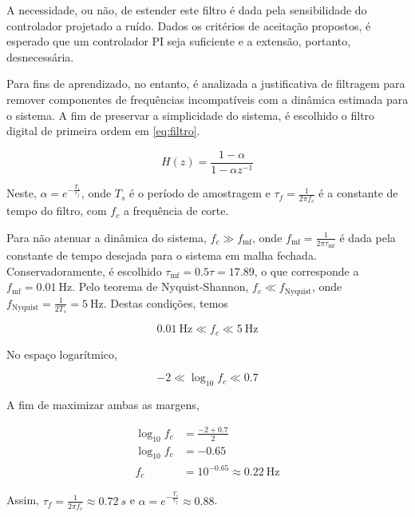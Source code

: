 \documentclass[conference,harvard,brazil,english]{sbatex}
\begin{document}
A necessidade, ou não, de estender este filtro é dada pela sensibilidade do controlador projetado a ruído\cite{Aguirre2023}. Dados os critérios de aceitação propostos, é esperado que um controlador PI seja suficiente e a extensão, portanto, desnecessária.

Para fins de aprendizado, no entanto, é analizada a justificativa de filtragem para remover componentes de frequências incompatíveis com a dinâmica estimada para o sistema. A fim de preservar a simplicidade do sistema, é escolhido o filtro digital de primeira ordem em \ref{eq:filtro}.

\begin{equation}
    \label{eq:filtro}
    H(z) = \frac{1 - \alpha}{1 - \alpha z^{-1}}
\end{equation}

Neste, $\alpha = e^{-\frac{T_s}{\tau_f}}$, onde $T_s$ é o período de amostragem e $\tau_f = \frac{1}{2 \pi f_c}$ é a constante de tempo do filtro, com $f_c$ a frequência de corte.

Para não atenuar a dinâmica do sistema, $f_c \gg f_\text{mf}$, onde $f_\text{mf} = \frac{1}{2 \pi \tau_\text{mf}}$ é dada pela constante de tempo desejada para o sistema em malha fechada. Conservadoramente, é escolhido $\tau_\text{mf} = 0.5 \tau = 17.89$, o que corresponde a $f_\text{mf} = 0.01\ \text{Hz}$. Pelo teorema de Nyquist-Shannon\cite{Aguirre2023}, $f_c \ll f_\text{Nyquist}$, onde $f_\text{Nyquist} = \frac{1}{2 T_s} = 5\ \text{Hz}$. Destas condições, temos

\begin{equation}
    \label{eq:condicoes_filtro}
    0.01\ \text{Hz} \ll f_c \ll 5\ \text{Hz}
\end{equation}

No espaço logarítmico,

\begin{equation}
    \label{eq:condicoes_filtro_log}
    -2 \ll \log_{10} f_c \ll 0.7
\end{equation}

A fim de maximizar ambas as margens,

\begin{align}
    \log_{10} f_c & = \frac{-2 + 0.7}{2} \\
    \log_{10} f_c & = -0.65 \\
    f_c & = 10^{-0.65} \approx 0.22\ \text{Hz}
\end{align}

Assim, $\tau_f = \frac{1}{2 \pi f_c} \approx 0.72\ s$ e $\alpha = e^{-\frac{T_s}{\tau_f}} \approx 0.88$.
\end{document}
